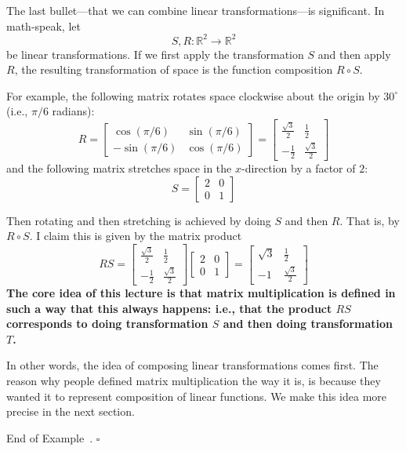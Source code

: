 \documentclass[10pt]{article}
\theoremstyle{definition}
\newtheorem{example}[theorem]{Example}
\renewenvironment{example}
{\begin{oldexample}}
  {\par\smallskip\hfill   End of Example~\theexample. $\square$    \par\end{oldexample}}
\newcommand{\R}{\mathbb{R}}           %
\begin{document}
The last bullet---that we can combine linear transformations---is significant.
In math-speak, let
\begin{equation*}
  S,R:\R^{2}\to \R^{2}
\end{equation*}
be linear transformations. If we first apply the transformation $S$ and then
apply $R$, the resulting transformation of space is the function composition
$R\circ S$.
\begin{example}
  For example, the following matrix rotates space clockwise about the origin
  by $30^{\circ}$ (i.e., $\pi/6$ radians):
  \begin{equation*}
    R
    =
    \begin{bmatrix}
      \cos(\pi/6) & \sin(\pi/6)\\
      -\sin(\pi/6)& \cos(\pi/6)
    \end{bmatrix}
    =
    \begin{bmatrix}
      \frac{\sqrt{3}}{2} & \frac{1}{2}\\
      -\frac{1}{2} & \frac{\sqrt{3}}{2}
    \end{bmatrix}
  \end{equation*}
  and the following matrix stretches space in the $x$-direction by a factor of
  $2$:
  \begin{equation*}
    S =
    \begin{bmatrix}
      2&0\\
      0&1
    \end{bmatrix}
  \end{equation*}

  Then rotating and then stretching is achieved by doing $S$ and then $R$.
  That is, by $R\circ S$. I claim this is given by the matrix product
  \begin{equation*}
    RS =
    \begin{bmatrix}
      \frac{\sqrt{3}}{2} & \frac{1}{2}\\
      -\frac{1}{2} & \frac{\sqrt{3}}{2}
    \end{bmatrix}
    \begin{bmatrix}
      2&0\\
      0&1
    \end{bmatrix}
    =
    \begin{bmatrix}
      \sqrt{3}& \frac{1}{2}\\
      -1 & \frac{\sqrt{3}}{2}
    \end{bmatrix}
  \end{equation*}
  \textbf{The core idea of this lecture is that matrix multiplication is
    defined in such a way that this always happens: i.e., that the product
    $RS$ corresponds to doing transformation $S$ and then doing transformation
    $T$.}

  In other words, the idea of composing linear transformations comes first.
  The reason why people defined matrix multiplication the way it is, is
  because they wanted it to represent composition of linear functions. We make
  this idea more precise in the next section.
\end{example}
\end{document}
